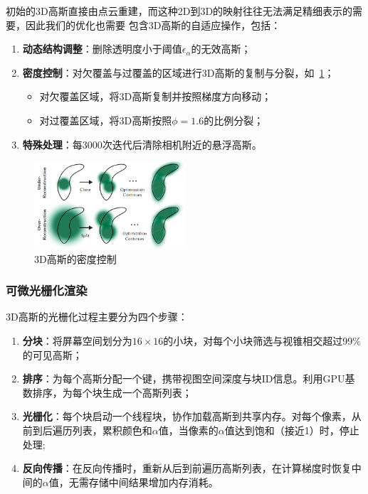 初始的3D高斯直接由点云重建，而这种2D到3D的映射往往无法满足精细表示的需要，因此我们的优化也需要
包含3D高斯的自适应操作，包括：
\begin{enumerate}
    \item \textbf{动态结构调整}：删除透明度小于阈值$\epsilon_{\alpha}$的无效高斯；
    \item \textbf{密度控制}：对欠覆盖与过覆盖的区域进行3D高斯的复制与分裂，如~\ref{fig:gauss-density}；
        \begin{itemize}
            \item 对欠覆盖区域，将3D高斯复制并按照梯度方向移动；
            \item 对过覆盖区域，将3D高斯按照$\phi=1.6$的比例分裂；
        \end{itemize}
    \item \textbf{特殊处理}：每3000次迭代后清除相机附近的悬浮高斯。
\end{enumerate}

\begin{figure}[ht]
    \centering
    \includegraphics[width=0.5\textwidth]{source/img/gauss_recon.png}
    \caption{3D高斯的密度控制}
    \label{fig:gauss-density}
\end{figure}

\subsubsection{可微光栅化渲染}

3D高斯的光栅化过程主要分为四个步骤：
\begin{enumerate}
    \item \textbf{分块}：将屏幕空间划分为$16\times 16$的小块，对每个小块筛选与视锥相交超过99\%的可见高斯；
    \item \textbf{排序}：为每个高斯分配一个键，携带视图空间深度与块ID信息。利用GPU基数排序，为每个块生成一个高斯列表；
    \item \textbf{光栅化}：每个块启动一个线程块，协作加载高斯到共享内存。对每个像素，从前到后遍历列表，累积颜色和$\alpha$值，当像素的$\alpha$值达到饱和（接近1）时，停止处理;
    \item \textbf{反向传播}：在反向传播时，重新从后到前遍历高斯列表，在计算梯度时恢复中间的$\alpha$值，无需存储中间结果增加内存消耗。
\end{enumerate}

